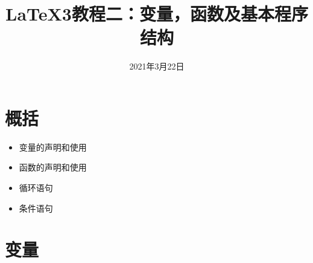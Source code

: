 \documentclass[aspectratio=169]{beamer}
\title{\LaTeX3教程二：变量，函数及基本程序结构}
\date{2021年3月22日}
\begin{document}
\maketitle

\newcommand{\dhrule}{%
\begin{tikzpicture}%
\draw[dashed, gray, ultra thick] (0,0)--(\linewidth, 0);
\end{tikzpicture}}

\newcommand{\lthint}{
{\scriptsize
\begin{itemize}
\item \texttt{tl}:凭据表
\item \texttt{str}：字符串
\item \texttt{int}：整型
\item \texttt{fp}：浮点数
\item \texttt{seq}：队列
\item \texttt{dim}：尺度/长度
\item \texttt{bool}：布尔型
\end{itemize}
\dhrule
\begin{itemize}
\item \texttt{N}：接收一个命令，传递命令本身。
\item \texttt{n}：接收一个凭据表。
\end{itemize}
}
}

\section{概括}

\begin{frame}
\begin{itemize}
\item 变量的声明和使用
\item 函数的声明和使用
\item 循环语句
\item 条件语句
\end{itemize}
\end{frame}

\section{变量}
\end{document}
